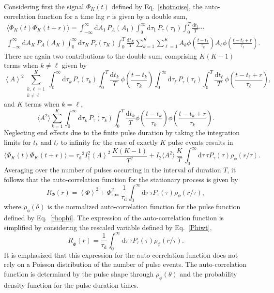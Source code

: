 \documentclass[aps,prb,12pt,a4paper,preprint,amsmath,amssymb,groupedaddress]{revtex4-1}
\newcommand{\ave}[1]{{\left<#1\right>}}
\newcommand{\rmd}{\text{d}}
\newcommand{\taud}{\ensuremath{\tau_\text{d}}}
\newcommand{\Phiave}{\ensuremath{\ave{\Phi}}}
\newcommand{\Phirms}{\ensuremath{\Phi}_\text{rms}}
\newcommand{\Phiwt}{\ensuremath{\widetilde{\Phi}}}
\newcommand{\aveA}{\ensuremath{\ave{A}}}
\newcommand{\Eqref}[1]{Eq.~\eqref{#1}}
\begin{document}
Considering first the signal $\Phi_K(t)$ defined by \Eqref{shotnoise}, the auto-correlation function for a time lag $r$ is given by a double sum,
\begin{multline}\label{PhiKcorr}
\langle{\Phi_K(t)\Phi_K(t+r)}\rangle = \int_{-\infty}^\infty \rmd A_1\,P_A(A_1) \int_0^\infty \rmd\tau_1\,P_\tau(\tau_1) \int_0^T \frac{\rmd t_1}{T} \cdots
\\
\int_{-\infty}^\infty \rmd A_K\,P_A(A_K) \int_0^\infty \rmd\tau_K\,P_\tau(\tau_K) \int_0^T \frac{\rmd t_K}{T} \sum_{k=1}^K\sum_{\ell=1}^K A_k\phi\left( \frac{t-t_k}{\tau_k} \right) A_\ell\phi\left( \frac{t-t_\ell+r}{\tau_\ell} \right) .
\end{multline}
There are again two contributions to the double sum, comprising $K(K-1)$ terms when $k\neq\ell$ given by
\begin{equation}
\aveA^2\sum_{\substack{k,\ell=1\\ k\neq\ell}}^K \int_0^\infty \rmd\tau_k\,P_\tau(\tau_k) \int_0^T \frac{\rmd t_k}{T}\,\phi\left( \frac{t-t_k}{\tau_k} \right) \int_0^\infty \rmd\tau_\ell\,P_\tau(\tau_\ell) \int_0^T \frac{\rmd t_\ell}{T}\,\phi\left( \frac{t-t_\ell+r}{\tau_\ell} \right) ,
\end{equation}
and $K$ terms when $k=\ell$,
\begin{equation}
\langle{A^2}\rangle \sum_{k=1}^K \int_0^\infty \rmd\tau_k\,P_\tau(\tau_k) \int_0^T\frac{\rmd t_k}{T}\phi\left( \frac{t-t_k}{\tau_k} \right)\phi\left( \frac{t-t_k+r}{\tau_k} \right) .
\end{equation}
Neglecting end effects due to the finite pulse duration by taking the integration limits for $t_k$ and $t_\ell$ to infinity for the case of exactly $K$ pulse events results in
\begin{equation}
\langle{\Phi_K(t)\Phi_K(t+r)}\rangle =
\taud^2 I_1^2 \aveA^2\,\frac{K(K-1)}{T^2} 
+ I_2 \langle{A^2}\rangle\,\frac{K}{T}\,\int_0^\infty \rmd\tau\,\tau P_\tau(\tau) \rho_\phi(r/\tau) .
\end{equation}
Averaging over the number of pulses occurring in the interval of duration $T$, it follows that the auto-correlation function for the stationary process is given by\cite{garcia-phpl}
\begin{equation} \label{Rphi}
R_{\Phi}(r) = \Phiave^2 + \Phirms^2\,\frac{1}{\taud}\int_0^\infty \rmd\tau\,\tau P_\tau(\tau) \rho_\phi(r/\tau) ,
\end{equation}
where $\rho_\phi(\theta)$ is the normalized auto-correlation function for the pulse function defined by \Eqref{rhophi}. The expression of the auto-correlation function is simplified by considering the rescaled variable defined by \Eqref{Phiwt},
\begin{equation} \label{RPhiwt}
R_{\Phiwt}(r) = \frac{1}{\taud}\int_0^\infty \rmd\tau\,\tau P_\tau(\tau) \rho_\phi(r/\tau) .
\end{equation}
It is emphasized that this expression for the auto-correlation function does not rely on a Poisson distribution of the number of pulse events. The auto-correlation function is determined by the pulse shape through $\rho_\phi(\theta)$ and the probability density function for the pulse duration times.
\end{document}

